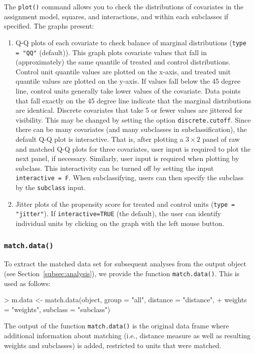 \documentclass[oneside,letterpaper,titlepage]{article}
\begin{document}
The \texttt{plot()} command allows you to check the distributions of
covariates in the assignment model, squares, and interactions, and
within each subclasses if specified.  The graphs present:
\begin{enumerate}
\item Q-Q plots of each covariate to check balance of marginal
  distributions (\texttt{type = "QQ"} (default)).  This graph plots
  covariate values that fall in (approximately) the same quantile of
  treated and control distributions.  Control unit quantile values are
  plotted on the x-axis, and treated unit quantile values are plotted
  on the y-axis.  If values fall below the 45 degree line, control
  units generally take lower values of the covariate.  Data points
  that fall exactly on the 45 degree line indicate that the marginal
  distributions are identical.  Discrete covariates that take 5 or
  fewer values are jittered for visibility.  This may be changed by
  setting the option \texttt{discrete.cutoff}.  Since there can be
  many covariates (and many subclasses in subclassification), the
  default Q-Q plot is interactive.  That is, after plotting a $3
  \times 2$ panel of raw and matched Q-Q plots for three covariates,
  user input is required to plot the next panel, if necessary.
  Similarly, user input is required when plotting by subclass.  This
  interactivity can be turned off by setting the input
  \texttt{interactive = F}. When subclassifying, users can then
  specify the subclass by the \texttt{subclass} input.
\item Jitter plots of the propensity score for treated and control
  units (\texttt{type = "jitter"}).  If \texttt{interactive=TRUE} (the default), the 
  user can identify individual units by clicking on the graph with the left mouse button.  
\end{enumerate}

\subsubsection{{\tt match.data()}}
\label{subsec:match.data}

To extract the matched data set for subsequent analyses from the
output object (see Section~\ref{subsec:analysis}), we provide the
function {\tt match.data()}.  This is used as follows:
\begin{Schunk}
\begin{Sinput}
> m.data <- match.data(object, group = "all", distance = "distance", 
+     weights = "weights", subclass = "subclass")
\end{Sinput}
\end{Schunk}
The output of the function {\tt match.data()} is the original data
frame where additional information about matching (i.e., distance
measure as well as resulting weights and subclasses) is added,
restricted to units that were matched.
\end{document}
